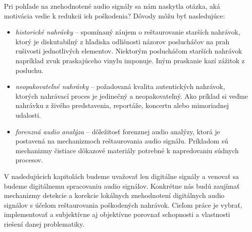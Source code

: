 Pri pohľade na znehodnotené audio signály sa nám naskytla otázka, aká motivácia vedie k redukcii ich poškodenia? Dôvody môžu byť nasledujúce:
\begin{itemize}
	\item \textit{historické nahrávky} -- spomínaný záujem o reštaurovanie starších nahrávok, ktorý je diskutabilný z hľadiska odlišnosti názorov poslucháčov na prah rušivosti jednotlivých elementov. Niektorým poslucháčom starších nahrávok napríklad zvuk praskajúceho vinylu imponuje. Iným praskanie kazí zážitok z posluchu.
	\item \textit{neopakovateľné nahrávky} -- požadovaná kvalita autentických nahrávok, ktorých nahrávací proces je jedinečný a neopakovateľný. Ako príklad si veďme nahrávku z živého predstavenia, reportáže, koncertu alebo mimoriadnej udalosti.
	\item \textit{forenzná audio analýza} -- dôležitosť forenznej audio analýzy, ktorá je postavená na mechanizmoch reštaurovania audio signálu. Príkladom sú mechanizmy čistiace dôkazové materiály potrebné k napredovaniu súdnych procesov.
\end{itemize}

V nasledujúcich kapitolách budeme uvažovať len digitálne signály a venovať sa budeme digitálnemu spracovaniu audio signálov. Konkrétne nás budú zaujímať mechanizmy detekcie a korekcie lokálnych znehodnotení digitálnych audio signálov s účelom reštaurovania poškodených nahrávok. Cieľom práce je vybrať, implementovať a subjektívne aj objektívne porovnať schopnosti a vlastnosti riešení danej problematiky.